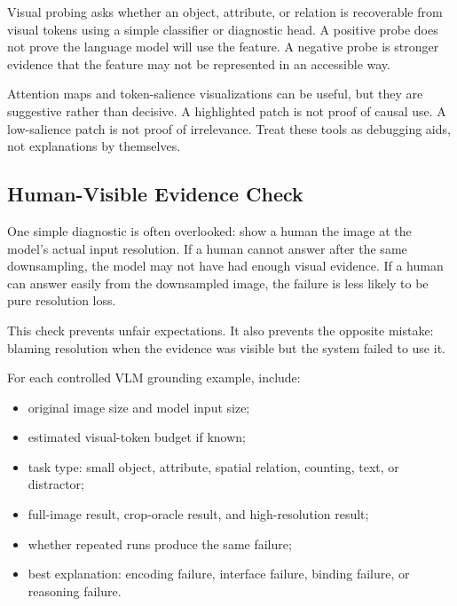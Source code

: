 Visual probing asks whether an object, attribute, or relation is recoverable from visual tokens using a simple classifier or diagnostic head. A positive probe does not prove the language model will use the feature. A negative probe is stronger evidence that the feature may not be represented in an accessible way.

Attention maps and token-salience visualizations can be useful, but they are suggestive rather than decisive. A highlighted patch is not proof of causal use. A low-salience patch is not proof of irrelevance. Treat these tools as debugging aids, not explanations by themselves.

\subsection{Human-Visible Evidence Check}

One simple diagnostic is often overlooked: show a human the image at the model's actual input resolution. If a human cannot answer after the same downsampling, the model may not have had enough visual evidence. If a human can answer easily from the downsampled image, the failure is less likely to be pure resolution loss.

This check prevents unfair expectations. It also prevents the opposite mistake: blaming resolution when the evidence was visible but the system failed to use it.

\begin{tcolorbox}[colback=orange!5, colframe=orange!60, title=\textbf{For Project~5: Report Template Additions}]
For each controlled VLM grounding example, include:
\begin{itemize}[nosep,leftmargin=1.5em]
  \item original image size and model input size;
  \item estimated visual-token budget if known;
  \item task type: small object, attribute, spatial relation, counting, text, or distractor;
  \item full-image result, crop-oracle result, and high-resolution result;
  \item whether repeated runs produce the same failure;
  \item best explanation: encoding failure, interface failure, binding failure, or reasoning failure.
\end{itemize}
\end{tcolorbox}

